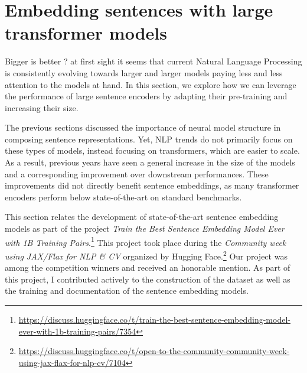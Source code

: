 \setchapterpreamble[u]{\margintoc}
\chapter{Embedding sentences with large transformer models}



Bigger is better ? at first sight it seems that current Natural Language Processing is consistently evolving towards larger and larger models paying less and less attention to the models at hand. In this section, we explore how we can leverage the performance of large sentence encoders by adapting their pre-training and increasing their size.

The previous sections discussed the importance of neural model structure in composing sentence representations. Yet, NLP trends do not primarily focus on these types of models, instead focusing on transformers, which are easier to scale. As a result, previous years have seen a general increase in the size of the models and a corresponding improvement over downstream performances. These improvements did not directly benefit sentence embeddings, as many transformer encoders perform below state-of-the-art on standard benchmarks. 

This section relates the development of state-of-the-art sentence embedding models as part of the project \textit{Train the Best Sentence Embedding Model Ever with 1B Training Pairs}.\footnote{\url{https://discuss.huggingface.co/t/train-the-best-sentence-embedding-model-ever-with-1b-training-pairs/7354}} This project took place during the \textit{Community week using JAX/Flax for NLP \& CV} organized by Hugging Face.\footnote{\url{https://discuss.huggingface.co/t/open-to-the-community-community-week-using-jax-flax-for-nlp-cv/7104}} Our project was among the competition winners and received an honorable mention. As part of this project, I contributed actively to the construction of the dataset as well as the training and documentation of the sentence embedding models.


